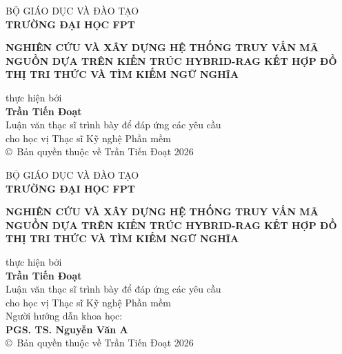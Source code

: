 \documentclass[12pt,a4paper,oneside]{report}
\begin{document}
\begin{titlepage}
    \begin{center}
        \large BỘ GIÁO DỤC VÀ ĐÀO TẠO \\
        \textbf{\large TRƯỜNG ĐẠI HỌC FPT} \\
        \vfill
        \vfill
        \begin{singlespace}
            \textbf{\Large NGHIÊN CỨU VÀ XÂY DỰNG HỆ THỐNG TRUY VẤN MÃ NGUỒN DỰA TRÊN KIẾN TRÚC HYBRID-RAG KẾT HỢP ĐỒ THỊ TRI THỨC VÀ TÌM KIẾM NGỮ NGHĨA}
        \end{singlespace}
        \vfill
        \large thực hiện bởi \\
        \large \textbf{Trần Tiến Đoạt} \\
        \vfill
        \large Luận văn thạc sĩ trình bày để đáp ứng các yêu cầu \\
        cho học vị Thạc sĩ Kỹ nghệ Phần mềm \\
        \vfill
        \vfill
        \large \copyright\ Bản quyền thuộc về Trần Tiến Đoạt 2026
    \end{center}
\end{titlepage}

\begin{titlepage}
    \begin{center}
        \large BỘ GIÁO DỤC VÀ ĐÀO TẠO \\
        \textbf{\large TRƯỜNG ĐẠI HỌC FPT} \\
        \vfill
        \vfill
        \begin{singlespace}
            \textbf{\Large NGHIÊN CỨU VÀ XÂY DỰNG HỆ THỐNG TRUY VẤN MÃ NGUỒN DỰA TRÊN KIẾN TRÚC HYBRID-RAG KẾT HỢP ĐỒ THỊ TRI THỨC VÀ TÌM KIẾM NGỮ NGHĨA}
        \end{singlespace}
        \vfill
        \large thực hiện bởi \\
        \large \textbf{Trần Tiến Đoạt} \\
        \vfill
        \large Luận văn thạc sĩ trình bày để đáp ứng các yêu cầu \\
        cho học vị Thạc sĩ Kỹ nghệ Phần mềm \\
        \vfill
        \vfill
        \large Người hướng dẫn khoa học: \\
        \large \textbf{PGS. TS. Nguyễn Văn A} \\
        \vfill
        \large \copyright\ Bản quyền thuộc về Trần Tiến Đoạt 2026
    \end{center}
\end{titlepage}
\end{document}
